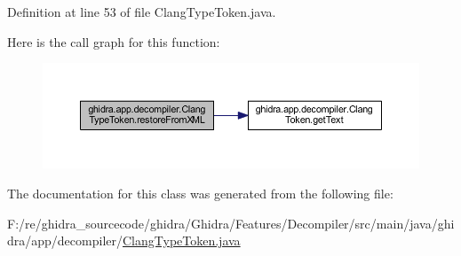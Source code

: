 Definition at line 53 of file Clang\+Type\+Token.\+java.

Here is the call graph for this function\+:
\nopagebreak
\begin{figure}[H]
\begin{center}
\leavevmode
\includegraphics[width=350pt]{classghidra_1_1app_1_1decompiler_1_1_clang_type_token_a53a5c4775d9a1901b95b86bddbb990f0_cgraph}
\end{center}
\end{figure}


The documentation for this class was generated from the following file\+:\begin{DoxyCompactItemize}
\item 
F\+:/re/ghidra\+\_\+sourcecode/ghidra/\+Ghidra/\+Features/\+Decompiler/src/main/java/ghidra/app/decompiler/\mbox{\hyperlink{_clang_type_token_8java}{Clang\+Type\+Token.\+java}}\end{DoxyCompactItemize}
